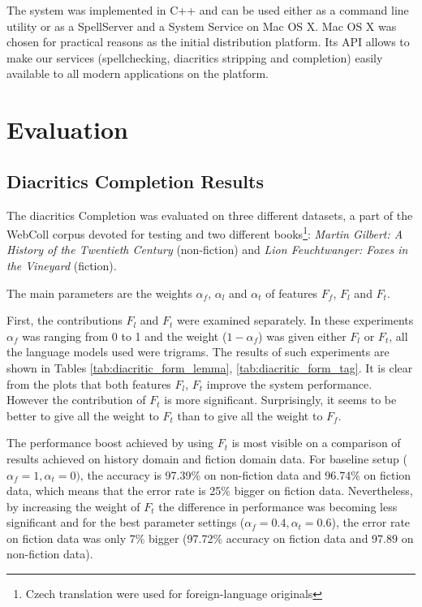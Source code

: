 \documentclass[11pt]{article}
\newcommand{\ignore}[1]{}
\begin{document}
The system was implemented in C++ and can be used either as a command
line utility or as a SpellServer and a System Service on Mac OS X. Mac OS X 
was chosen for practical reasons as the initial distribution platform. Its API allows 
to make our services (spellchecking, diacritics stripping and completion)  
easily available to all modern applications on the platform.

\section{Evaluation}
\label{sec:eval}

\subsection{Diacritics Completion Results}
The diacritics Completion was evaluated on three different datasets, a
part of the
WebColl corpus devoted for testing and two different
books\footnote{Czech translation were used for foreign-language originals}: \emph{Martin Gilbert: A History of
the Twentieth Century} (non-fiction) and \emph{Lion Feuchtwanger: Foxes in the
Vineyard} (fiction).

The main parameters are the weights $\alpha_f$, $\alpha_l$ and $\alpha_t$ of
features $F_f$, $F_l $ and $F_t$.

First, the contributions $F_l$ and $F_t$ were examined separately. In these
experiments $\alpha_f$ was ranging from 0 to 1 and the weight ($1 - \alpha_f$)
was given either $F_l$ or $F_t$, all the language models used were trigrams.
The results of such experiments are shown in Tables \ref{tab:diacritic_form_lemma},
\ref{tab:diacritic_form_tag}. It is clear from the plots that
both features $F_l$, $F_t$ improve the system performance. However the
contribution of $F_t$ is more significant. Surprisingly, it seems to
be better to
give all the weight to $F_t$ than to give all the weight to $F_f$.\ignore{,
only in the case of WebColl, $F_f$ alone was better than $F_t$ alone (98.12\%
vs. 98.03\%).}

The performance boost achieved by using $F_t$ is most visible on a comparison
of results achieved on history domain and fiction domain data. For baseline
setup ($\alpha_f = 1, \alpha_t = 0)$, the accuracy is 97.39\% on non-fiction
data and 96.74\% on fiction data, which means that the error rate is 25\%
bigger on fiction data. Nevertheless, by increasing the weight of $F_t$ the
difference in performance was becoming less significant and for the best
parameter settings ($\alpha_f = 0.4, \alpha_t = 0.6$), the error rate on
fiction data was only 7\% bigger (97.72\% accuracy on fiction data and 97.89 on
non-fiction data).
\end{document}
